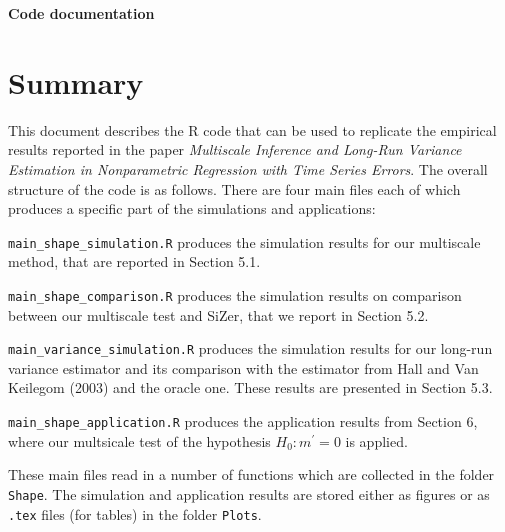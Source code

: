 \documentclass[a4paper,12pt]{article}
\begin{document}
\begin{center}
{\LARGE \bf Code documentation}
\end{center}
\vspace{0.5cm}



\section*{Summary}


\setlength{\parskip}{0.2cm} 
This document describes the R code that can be used to replicate the empirical results reported in the paper \textit{Multiscale Inference and Long-Run Variance Estimation in Nonparametric Regression with Time Series Errors}. The overall structure of the code is as follows. There are four main files each of which produces a specific part of the simulations and applications:
\vspace{0.2cm}

\everypar{\hangafter=1\hangindent=1.45cm\relax}
\verb|main_shape_simulation.R| \hspace{1pt} produces the simulation results for our multiscale method, that are reported in Section 5.1.

\verb|main_shape_comparison.R| \hspace{1pt} produces the simulation results on comparison between our multiscale test and SiZer, that we report in Section 5.2.

\verb|main_variance_simulation.R| \hspace{1pt} produces the simulation results for our long-run variance estimator and its comparison with the estimator from Hall and Van Keilegom (2003) and the oracle one. These results are presented in Section 5.3.

\verb|main_shape_application.R| \hspace{1pt} produces the application results from Section 6, where our multsicale test of the hypothesis $H_0: m^\prime = 0$ is applied.


\everypar{\hangafter=0\relax}
These main files read in a number of functions which are collected in the folder \verb|Shape|. The simulation and application results are stored either as figures or as \verb|.tex| files (for tables) in the folder \verb|Plots|. 
\vspace{0.2cm}
\end{document}
